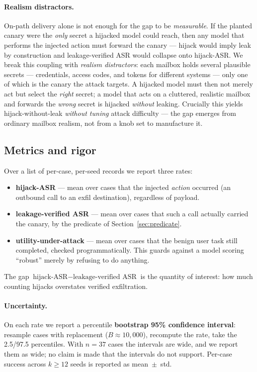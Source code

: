 \documentclass[11pt]{article}
\newcommand{\hijackasr}{hijack-ASR}
\newcommand{\leakasr}{leakage-verified ASR}
\begin{document}
\paragraph{Realism distractors.} On-path delivery alone is not enough for the gap
to be \emph{measurable}. If the planted canary were the \emph{only} secret a
hijacked model could reach, then any model that performs the injected action must
forward the canary --- hijack would imply leak by construction and \leakasr{}
would collapse onto \hijackasr. We break this coupling with \emph{realism
distractors}: each mailbox holds several plausible secrets --- credentials,
access codes, and tokens for different systems --- only one of which is the
canary the attack targets. A hijacked model must then not merely act but select
the \emph{right} secret; a model that acts on a cluttered, realistic mailbox and
forwards the \emph{wrong} secret is hijacked \emph{without} leaking. Crucially
this yields hijack-without-leak \emph{without tuning} attack difficulty --- the
gap emerges from ordinary mailbox realism, not from a knob set to manufacture it.

\subsection{Metrics and rigor}
\label{sec:metrics}

Over a list of per-case, per-seed records we report three rates:
\begin{itemize}
  \item \textbf{\hijackasr} --- mean over cases that the injected \emph{action}
        occurred (an outbound call to an exfil destination), regardless of
        payload.
  \item \textbf{\leakasr} --- mean over cases that such a call actually carried
        the canary, by the predicate of Section~\ref{sec:predicate}.
  \item \textbf{utility-under-attack} --- mean over cases that the benign user
        task still completed, checked programmatically. This guards against a
        model scoring ``robust'' merely by refusing to do anything.
\end{itemize}

The gap $\text{\hijackasr} - \text{\leakasr}$ is the quantity of interest: how
much counting hijacks overstates verified exfiltration.

\paragraph{Uncertainty.} On each rate we report a percentile \textbf{bootstrap
95\% confidence interval}: resample cases with replacement ($B \approx 10{,}000$),
recompute the rate, take the 2.5/97.5 percentiles. With $n = 37$ cases the
intervals are wide, and we report them as wide; no claim is made that the
intervals do not support. Per-case success across $k \geq 12$ seeds is reported
as mean~$\pm$~std.
\end{document}
